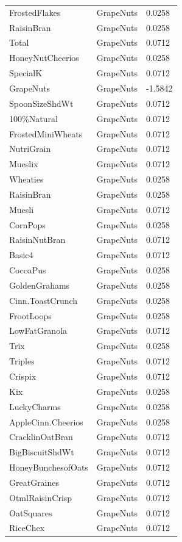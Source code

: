 \begin{table}[!htbp]
\begin{tabular}{lll}
FrostedFlakes & GrapeNuts & 0.0258
\\
RaisinBran & GrapeNuts & 0.0258
\\
Total & GrapeNuts & 0.0712
\\
HoneyNutCheerios & GrapeNuts & 0.0258
\\
SpecialK & GrapeNuts & 0.0712
\\
GrapeNuts & GrapeNuts & -1.5842
\\
SpoonSizeShdWt & GrapeNuts & 0.0712
\\
100\%Natural & GrapeNuts & 0.0712
\\
FrostedMiniWheats & GrapeNuts & 0.0712
\\
NutriGrain & GrapeNuts & 0.0712
\\
Mueslix & GrapeNuts & 0.0712
\\
Wheaties & GrapeNuts & 0.0258
\\
RaisinBran & GrapeNuts & 0.0258
\\
Muesli & GrapeNuts & 0.0712
\\
CornPops & GrapeNuts & 0.0258
\\
RaisinNutBran & GrapeNuts & 0.0712
\\
Basic4 & GrapeNuts & 0.0712
\\
CocoaPus & GrapeNuts & 0.0258
\\
GoldenGrahams & GrapeNuts & 0.0258
\\
Cinn.ToastCrunch & GrapeNuts & 0.0258
\\
FrootLoops & GrapeNuts & 0.0258
\\
LowFatGranola & GrapeNuts & 0.0712
\\
Trix & GrapeNuts & 0.0258
\\
Triples & GrapeNuts & 0.0712
\\
Crispix & GrapeNuts & 0.0712
\\
Kix & GrapeNuts & 0.0258
\\
LuckyCharms & GrapeNuts & 0.0258
\\
AppleCinn.Cheerios & GrapeNuts & 0.0258
\\
CracklinOatBran & GrapeNuts & 0.0712
\\
BigBiscuitShdWt & GrapeNuts & 0.0712
\\
HoneyBunchesofOats & GrapeNuts & 0.0712
\\
GreatGraines & GrapeNuts & 0.0712
\\
OtmlRaisinCrisp & GrapeNuts & 0.0712
\\
OatSquares & GrapeNuts & 0.0712
\\
RiceChex & GrapeNuts & 0.0712

\end{tabular}
\end{table}

